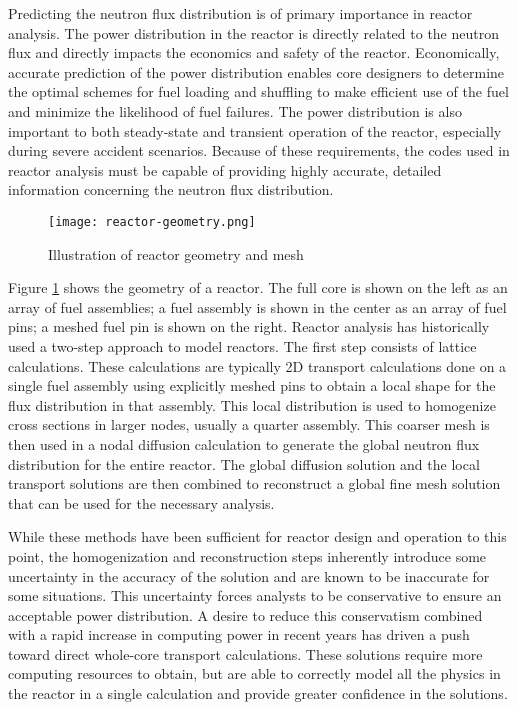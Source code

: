 Predicting the neutron flux distribution is of primary importance in reactor analysis.  The power distribution in the reactor is directly related to the neutron flux and directly impacts the economics and safety of the reactor.  Economically, accurate prediction of the power distribution enables core designers to determine the optimal schemes for fuel loading and shuffling to make efficient use of the fuel and minimize the likelihood of fuel failures.  The power distribution is also important to both steady-state and transient operation of the reactor, especially during severe accident scenarios.  Because of these requirements, the codes used in reactor analysis must be capable of providing highly accurate, detailed information concerning the neutron flux distribution.

\begin{figure}[h]
    \centering
    \texttt{[image: reactor-geometry.png]}
    \caption{Illustration of reactor geometry and mesh}\label{f:reactor-geometry}
\end{figure}

Figure \ref{f:reactor-geometry} shows the geometry of a reactor.  The full core is shown on the left as an array of fuel assemblies; a fuel assembly is shown in the center as an array of fuel pins; a meshed fuel pin is shown on the right.  Reactor analysis has historically used a two-step approach to model reactors.  The first step consists of lattice calculations.  These calculations are typically 2D transport calculations done on a single fuel assembly using explicitly meshed pins to obtain a local shape for the flux distribution in that assembly.  This local distribution is used to homogenize cross sections in larger nodes, usually a quarter assembly.  This coarser mesh is then used in a nodal diffusion calculation to generate the global neutron flux distribution for the entire reactor.  The global diffusion solution and the local transport solutions are then combined to reconstruct a global fine mesh solution that can be used for the necessary analysis.

While these methods have been sufficient for reactor design and operation to this point, the homogenization and reconstruction steps inherently introduce some uncertainty in the accuracy of the solution and are known to be inaccurate for some situations.  This uncertainty forces analysts to be conservative to ensure an acceptable power distribution.  A desire to reduce this conservatism combined with a rapid increase in computing power in recent years has driven a push toward direct whole-core transport calculations.  These solutions require more computing resources to obtain, but are able to correctly model all the physics in the reactor in a single calculation and provide greater confidence in the solutions.

